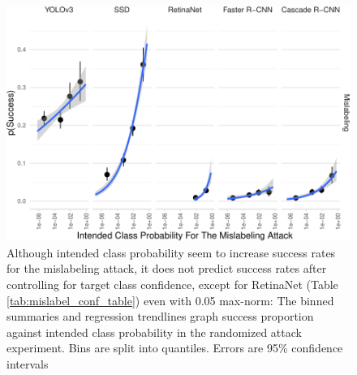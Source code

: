 \documentclass[
]{article}
\begin{document}
\begin{figure}[tb]

{\centering \includegraphics{imgs-normed/mislabel_conf_graph-1} 

}

\caption{Although intended class probability seem to increase success rates for the mislabeling attack, it does not predict success rates after controlling for target class confidence, except for RetinaNet (Table \ref{tab:mislabel_conf_table}) even with 0.05 max-norm:  The binned summaries and regression trendlines graph success proportion against intended class probability in the randomized attack experiment. Bins are split into quantiles. Errors are 95\% confidence intervals}\label{fig:mislabel_conf_graph}
\end{figure}

\begingroup\fontsize{9}{11}\selectfont
\end{document}
